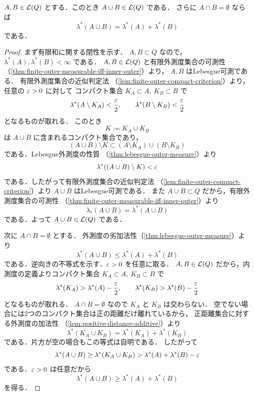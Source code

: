 \begin{lemma}[有界閉区間内の有限和と有限加法性]\label{lem:local-measurable-finite-union-additivity}
$A,B\in\mathcal L(Q)$ とする．このとき $A\cup B\in\mathcal L(Q)$ である．
さらに $A\cap B=\emptyset$ ならば
\[
\lambda^*(A\cup B)=\lambda^*(A)+\lambda^*(B)
\]
である．
\end{lemma}
\begin{proof}
まず有限和に関する閉性を示す．
$A,B\subset Q$ なので，$\lambda^*(A),\lambda^*(B)<\infty$ である．
$A,B\in\mathcal L(Q)$ と有限外測度集合の可測性
（\cref{thm:finite-outer-measurable-iff-inner-outer}）より，
$A,B$ はLebesgue可測である．
有限外測度集合の近似判定法
（\cref{lem:finite-outer-compact-criterion}）より，任意の $\varepsilon>0$ に対して
コンパクト集合 $K_A\subset A,\ K_B\subset B$ で
\[
\lambda^*(A\setminus K_A)<\frac{\varepsilon}{2},
\qquad
\lambda^*(B\setminus K_B)<\frac{\varepsilon}{2}
\]
となるものが取れる．
このとき
\[
K:=K_A\cup K_B
\]
は $A\cup B$ に含まれるコンパクト集合であり，
\[
(A\cup B)\setminus K
\subset
(A\setminus K_A)\cup(B\setminus K_B)
\]
である．Lebesgue外測度の性質
（\cref{thm:lebesgue-outer-measure}）より
\[
\lambda^*((A\cup B)\setminus K)<\varepsilon
\]
である．したがって有限外測度集合の近似判定法
（\cref{lem:finite-outer-compact-criterion}）より $A\cup B$ はLebesgue可測である．
また $A\cup B\subset Q$ だから，有限外測度集合の可測性
（\cref{thm:finite-outer-measurable-iff-inner-outer}）より
\[
\lambda_*(A\cup B)=\lambda^*(A\cup B)
\]
である．よって $A\cup B\in\mathcal L(Q)$ である．

次に $A\cap B=\emptyset$ とする．
外測度の劣加法性（\cref{thm:lebesgue-outer-measure}）より
\[
\lambda^*(A\cup B)\le \lambda^*(A)+\lambda^*(B)
\]
である．逆向きの不等式を示す．$\varepsilon>0$ を任意に取る．
$A,B\in\mathcal L(Q)$ だから，内測度の定義よりコンパクト集合
$K_A\subset A,\ K_B\subset B$ で
\[
\lambda^*(K_A)>\lambda^*(A)-\frac{\varepsilon}{2},
\qquad
\lambda^*(K_B)>\lambda^*(B)-\frac{\varepsilon}{2}
\]
となるものが取れる．
$A\cap B=\emptyset$ なので $K_A$ と $K_B$ は交わらない．
空でない場合には2つのコンパクト集合は正の距離だけ離れているから，
正距離集合に対する外測度の加法性
（\cref{lem:positive-distance-additive}）より
\[
\lambda^*(K_A\cup K_B)
=
\lambda^*(K_A)+\lambda^*(K_B)
\]
である．片方が空の場合もこの等式は自明である．
したがって
\[
\lambda^*(A\cup B)
\ge
\lambda^*(K_A\cup K_B)
>
\lambda^*(A)+\lambda^*(B)-\varepsilon
\]
である．$\varepsilon>0$ は任意だから
\[
\lambda^*(A\cup B)\ge \lambda^*(A)+\lambda^*(B)
\]
を得る．
\end{proof}

